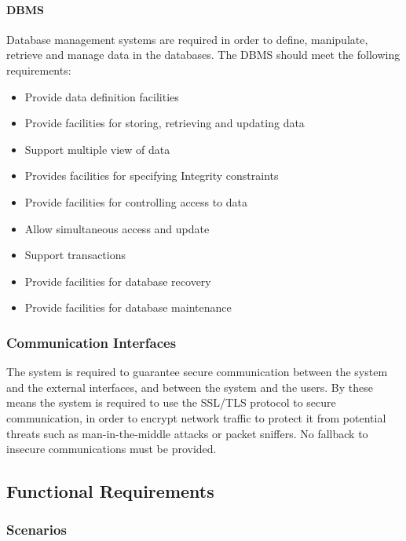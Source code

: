 \paragraph{DBMS} Database management systems are required in order to define, manipulate, retrieve and manage data in the databases. The DBMS should meet the following requirements:

	\begin{itemize}
		\item Provide data definition facilities
		\item Provide facilities for storing, retrieving and updating data
		\item Support multiple view of data
		\item Provides facilities for specifying Integrity constraints
		\item Provide facilities for controlling access to data
		\item Allow simultaneous access and update 
		\item Support transactions
		\item Provide facilities for database recovery
		\item Provide facilities for database maintenance
	\end{itemize}

\subsubsection{Communication Interfaces}
\label{sec:ci}

	The system is required to guarantee secure communication between the system and the external interfaces, and between the system and the users. By these means the system is required to use the SSL/TLS protocol to secure communication, in order to encrypt network traffic to protect it from potential threats such as man-in-the-middle attacks or packet sniffers. No fallback to insecure communications must be provided.

\subsection{Functional Requirements}

\subsubsection{Scenarios}

